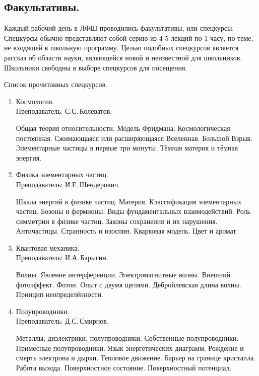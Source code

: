 \documentclass[12pt,a4paper,oneside,draft]{scrartcl}
\begin{document}
\subsection{Факультативы.}
\label{sec:elective}

Каждый рабочий день в ЛФШ проводились факультативы, или
спецкурсы. Спецкурсы обычно представляют собой серию из 4-5 лекций по
1 часу, по теме, не входящей в школьную программу. Целью подобных
спецкурсов является рассказ об области науки, являющейся новой и
неизвестной для школьников. Школьники свободны в выборе спецкурсов для
посещения.

\begin{center}
\textsf{Список прочитанных спецкурсов.}  
\end{center}

\begin{enumerate}
\item Космология. \\ \textsf{Преподаватель: С.С.\,Колеватов.}

  Общая теория относительности. Модель Фридмана. Космологическая
  постоянная. Сжимающаяся или расширяющаяся Вселенная. Большой
  Взрыв. Элементарные частицы в первые три минуты. Тёмная материя и
  тёмная энергия.

\item Физика элементарных частиц. \\ \textsf{Преподаватель: И.Е.\,Шендерович}.

  Шкала энергий в физике частиц. Материя. Классификация элементарных
  частиц. Бозоны и фермионы. Виды фундаментальных взаимодействий. Роль
  симметрии в физике частиц. Законы сохранения и их
  нарушения. Античастицы. Странность и изоспин. Кварковая модель. Цвет
  и аромат.

\item Квантовая механика. \\ \textsf{Преподаватель: И.А.\,Барыгин}.

  Волны. Явление интерференции. Электромагнитные волны. Внешний
  фотоэффект. Фотон. Опыт с двумя щелями. Дебройлевская длина
  волны. Принцип неопределённости.

\item Полупроводники.  \\ \textsf{Преподаватель: Д.С.\,Смирнов}.

  Металлы, диэлектрики, полупроводники. Собственные
  полупроводники. Примесные полупроводники. Язык энергетических
  диаграмм. Рождение и смерть электрона и дырки. Тепловое
  движение. Барьер на границе кристалла. Работа выхода. Поверхностное
  состояние. Поверхностный потенциал. 


\end{enumerate}
\end{document}
